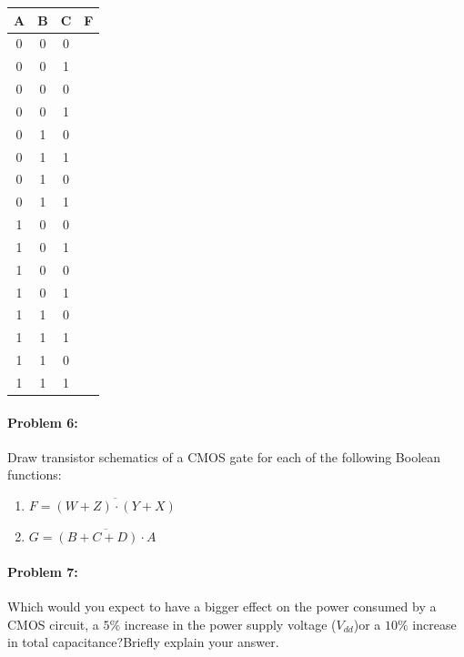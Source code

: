 \documentclass[12pt,letterpaper,titlepage]{article}
\begin{document}
\begin{raggedright}
\begin{center}
\begin{paracol}{3}
\begin{tabular}{|ccc|c|}
\hline
   A & B & C & F 
\\\hline
   0 & 0 & 0 &   
\\ 0 & 0 & 1 &   
\\ 0 & 0 & 0 &   
\\ 0 & 0 & 1 &   
\\ 0 & 1 & 0 &   
\\ 0 & 1 & 1 &   
\\ 0 & 1 & 0 &   
\\ 0 & 1 & 1 &   
\\ 1 & 0 & 0 &   
\\ 1 & 0 & 1 &   
\\ 1 & 0 & 0 &   
\\ 1 & 0 & 1 &   
\\ 1 & 1 & 0 &   
\\ 1 & 1 & 1 &   
\\ 1 & 1 & 0 &   
\\ 1 & 1 & 1 &   
\\\hline

\end{tabular}
\end{paracol}
\end{center}

\paragraph{Problem 6: }
Draw transistor schematics of a CMOS gate for each of the following Boolean functions:
\begin{enumerate}[label=\alph*)]
\item $F=\overline{(W+Z)\cdot(Y+X)}$
\item $G=\overline{(B+C+D)\cdot A}$
\end{enumerate}

\paragraph{Problem 7: }
Which would you expect to have a bigger effect on the power consumed by a CMOS circuit, a $5\%$ increase in the power supply voltage ($V_{dd}$)or a $10\%$ increase in total capacitance?Briefly explain your answer.

\end{raggedright}
\end{document}
